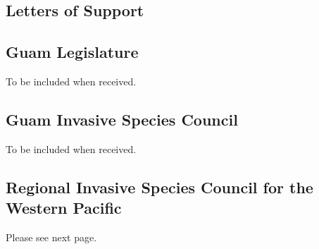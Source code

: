 \documentclass[12pt,letterpaper,english,bibliography=totocnumbered, abstract=on]{scrartcl}
\begin{document}
\begin{appendices}
\section{Letters of Support}

\subsection{Guam Legislature}
To be included when received.

\subsection{Guam Invasive Species Council}
To be included  when received.

\subsection{Regional Invasive Species Council for the Western Pacific}
Please see next page.


%
%
%
%
%
%

\end{appendices}
\end{document}
